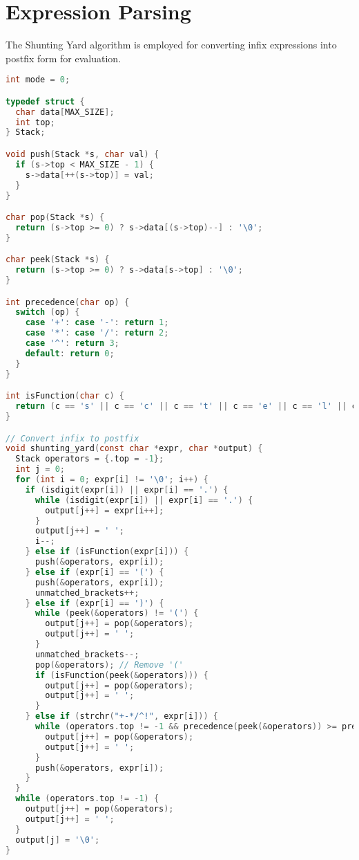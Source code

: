 \documentclass[conference]{IEEEtran}
\begin{document}
\section{Expression Parsing}
The Shunting Yard algorithm is employed for converting infix expressions into postfix form for evaluation.

\begin{lstlisting}[language=C, caption={Simplified Parser Implementation}]
int mode = 0;

typedef struct {
  char data[MAX_SIZE];
  int top;
} Stack;

void push(Stack *s, char val) {
  if (s->top < MAX_SIZE - 1) {
    s->data[++(s->top)] = val;
  }
}

char pop(Stack *s) {
  return (s->top >= 0) ? s->data[(s->top)--] : '\0';
}

char peek(Stack *s) {
  return (s->top >= 0) ? s->data[s->top] : '\0';
}

int precedence(char op) {
  switch (op) {
    case '+': case '-': return 1;
    case '*': case '/': return 2;
    case '^': return 3;
    default: return 0;
  }
}

int isFunction(char c) {
  return (c == 's' || c == 'c' || c == 't' || c == 'e' || c == 'l' || c == 'z' || c == 'y' || c == 'x' || c == 'q');
}

// Convert infix to postfix
void shunting_yard(const char *expr, char *output) {
  Stack operators = {.top = -1};
  int j = 0;
  for (int i = 0; expr[i] != '\0'; i++) {
    if (isdigit(expr[i]) || expr[i] == '.') {
      while (isdigit(expr[i]) || expr[i] == '.') {
        output[j++] = expr[i++];
      }
      output[j++] = ' ';
      i--;
    } else if (isFunction(expr[i])) {
      push(&operators, expr[i]);
    } else if (expr[i] == '(') {
      push(&operators, expr[i]);
      unmatched_brackets++;
    } else if (expr[i] == ')') {
      while (peek(&operators) != '(') {
        output[j++] = pop(&operators);
        output[j++] = ' ';
      }
      unmatched_brackets--;
      pop(&operators); // Remove '('
      if (isFunction(peek(&operators))) {
        output[j++] = pop(&operators);
        output[j++] = ' ';
      }
    } else if (strchr("+-*/^!", expr[i])) {
      while (operators.top != -1 && precedence(peek(&operators)) >= precedence(expr[i])) {
        output[j++] = pop(&operators);
        output[j++] = ' ';
      }
      push(&operators, expr[i]);
    }
  }
  while (operators.top != -1) {
    output[j++] = pop(&operators);
    output[j++] = ' ';
  }
  output[j] = '\0';
}


\end{lstlisting}
\end{document}

